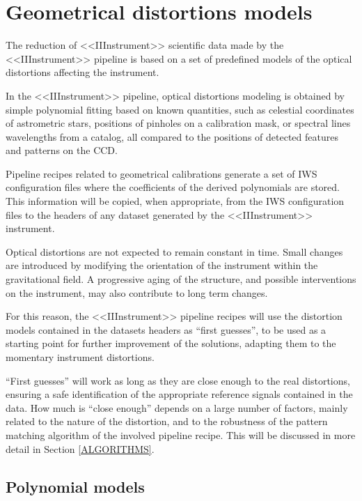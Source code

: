 
\section{Geometrical distortions models}
\label{DISTORTIONS}

The reduction of <<IIInstrument>> scientific data made by the <<IIInstrument>> pipeline 
is based on a set of predefined models of the optical distortions
affecting the instrument.

In the <<IIInstrument>> pipeline, optical distortions modeling is obtained
by simple polynomial fitting based on known quantities, 
such as celestial coordinates of astrometric stars,
positions of pinholes on a calibration mask, or spectral lines
wavelengths from a catalog, all compared to the positions of detected
features and patterns on the CCD.

Pipeline recipes related to geometrical calibrations
generate a set of IWS configuration files
where the coefficients of the derived polynomials are stored.
This information will be copied, when appropriate, from the IWS configuration
files to the headers of any dataset generated by the <<IIInstrument>>
instrument.

Optical distortions are not expected to remain constant in time.
Small changes are introduced by modifying the orientation of
the instrument within the gravitational field. A progressive
aging of the structure, and possible interventions on the
instrument, may also contribute to long term changes.

For this reason, the <<IIInstrument>> pipeline recipes will use the
distortion models contained in the datasets headers as
``first guesses'', to be used as a starting point
for further improvement of the solutions, adapting them to the
momentary instrument distortions.

``First guesses'' will work as long as they are close
enough to the real distortions, ensuring a safe identification
of the appropriate reference signals contained in the data.
How much is ``close enough'' depends on a large number of
factors, mainly related to the nature of the distortion,
and to the robustness of the pattern matching algorithm of
the involved pipeline recipe. This will be discussed in more
detail in Section \ref{ALGORITHMS}.

\subsection{Polynomial models}
\label{POLY}

